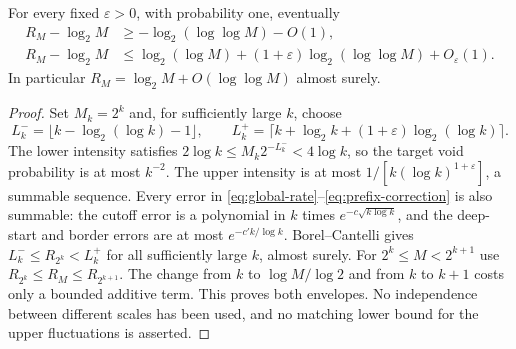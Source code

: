 \begin{corollary}\label{cor:as-longest}
For every fixed $\varepsilon>0$, with probability one, eventually
\begin{align}
 R_M-\log_2M&\ge-\log_2(\log\log M)-O(1),
                                          \label{eq:as-lower}\\
 R_M-\log_2M&\le\log_2(\log M)
        +(1+\varepsilon)\log_2(\log\log M)+O_\varepsilon(1).
                                          \label{eq:as-upper}
\end{align}
In particular $R_M=\log_2M+O(\log\log M)$ almost surely.
\end{corollary}
\begin{proof}
Set $M_k=2^k$ and, for sufficiently large $k$, choose
\[
 L_k^-=\lfloor k-\log_2(\log k)-1\rfloor,\qquad
 L_k^+=\lceil k+\log_2k+(1+\varepsilon)\log_2(\log k)\rceil.
\]
The lower intensity satisfies $2\log k\le M_k2^{-L_k^-}<4\log k$,
so the target void probability is at most $k^{-2}$. The upper intensity
is at most $1/[k(\log k)^{1+\varepsilon}]$, a summable sequence.
Every error in \eqref{eq:global-rate}--\eqref{eq:prefix-correction} is also
summable: the cutoff error is a polynomial in $k$ times
$e^{-c\sqrt{k\log k}}$, and the deep-start and border errors are at most
$e^{-c'k/\log k}$. Borel--Cantelli gives
$L_k^-\le R_{2^k}<L_k^+$ for all sufficiently large $k$, almost surely.
For $2^k\le M<2^{k+1}$ use $R_{2^k}\le R_M\le R_{2^{k+1}}$.
The change from $k$ to $\log M/\log2$ and from $k$ to $k+1$ costs only
a bounded additive term. This proves both envelopes. No independence
between different scales has been used, and no matching lower bound for
the upper fluctuations is asserted.
\end{proof}

